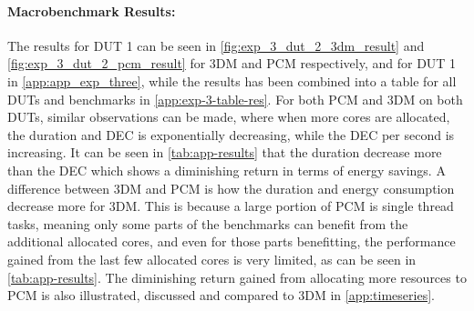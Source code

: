


\paragraph*{Macrobenchmark Results:} The results for DUT 1 can be seen in \cref{fig:exp_3_dut_2_3dm_result} and \cref{fig:exp_3_dut_2_pcm_result} for 3DM and PCM respectively, and for DUT 1 in \cref{app:app_exp_three}, while the results has been combined into a table for all DUTs and benchmarks in \cref{app:exp-3-table-res}. For both PCM and 3DM on both DUTs, similar observations can be made, where when more cores are allocated, the duration and DEC is exponentially decreasing, while the DEC per second is increasing. It can be seen in \cref{tab:app-results} that the duration decrease more than the DEC which shows a diminishing return in terms of energy savings. A difference between 3DM and PCM is how the duration and energy consumption decrease more for 3DM. This is because a large portion of PCM is single thread tasks, meaning only some parts of the benchmarks can benefit from the additional allocated cores, and even for those parts benefitting, the performance gained from the last few allocated cores is very limited, as can be seen in \cref{tab:app-results}. The diminishing return gained from allocating more resources to PCM is also illustrated, discussed and compared to 3DM in \cref{app:timeseries}.



